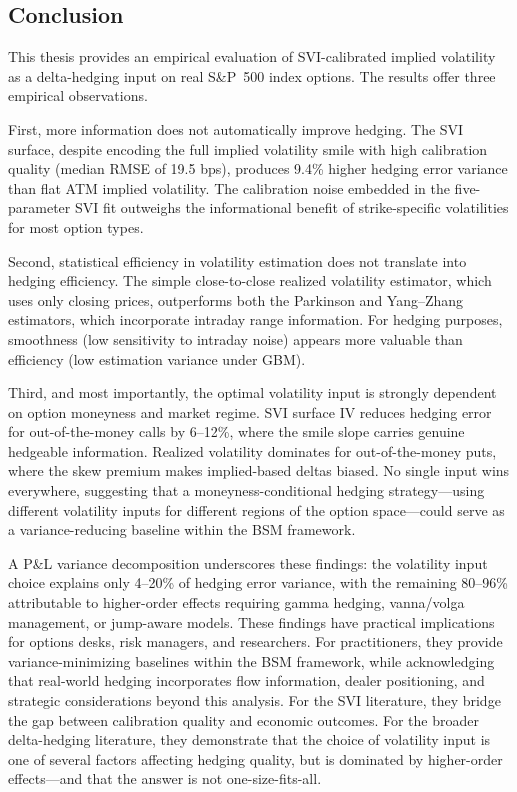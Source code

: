 \documentclass[12pt, letterpaper]{article}
\begin{document}
\subsection{Conclusion}

This thesis provides an empirical evaluation of SVI-calibrated implied volatility as a delta-hedging input on real S\&P~500 index options. The results offer three empirical observations.

First, more information does not automatically improve hedging. The SVI surface, despite encoding the full implied volatility smile with high calibration quality (median RMSE of 19.5 bps), produces 9.4\% higher hedging error variance than flat ATM implied volatility. The calibration noise embedded in the five-parameter SVI fit outweighs the informational benefit of strike-specific volatilities for most option types.

Second, statistical efficiency in volatility estimation does not translate into hedging efficiency. The simple close-to-close realized volatility estimator, which uses only closing prices, outperforms both the Parkinson and Yang--Zhang estimators, which incorporate intraday range information. For hedging purposes, smoothness (low sensitivity to intraday noise) appears more valuable than efficiency (low estimation variance under GBM).

Third, and most importantly, the optimal volatility input is strongly dependent on option moneyness and market regime. SVI surface IV reduces hedging error for out-of-the-money calls by 6--12\%, where the smile slope carries genuine hedgeable information. Realized volatility dominates for out-of-the-money puts, where the skew premium makes implied-based deltas biased. No single input wins everywhere, suggesting that a moneyness-conditional hedging strategy---using different volatility inputs for different regions of the option space---could serve as a variance-reducing baseline within the BSM framework.

A P\&L variance decomposition underscores these findings: the volatility input choice explains only 4--20\% of hedging error variance, with the remaining 80--96\% attributable to higher-order effects requiring gamma hedging, vanna/volga management, or jump-aware models. These findings have practical implications for options desks, risk managers, and researchers. For practitioners, they provide variance-minimizing baselines within the BSM framework, while acknowledging that real-world hedging incorporates flow information, dealer positioning, and strategic considerations beyond this analysis. For the SVI literature, they bridge the gap between calibration quality and economic outcomes. For the broader delta-hedging literature, they demonstrate that the choice of volatility input is one of several factors affecting hedging quality, but is dominated by higher-order effects---and that the answer is not one-size-fits-all.
\end{document}
